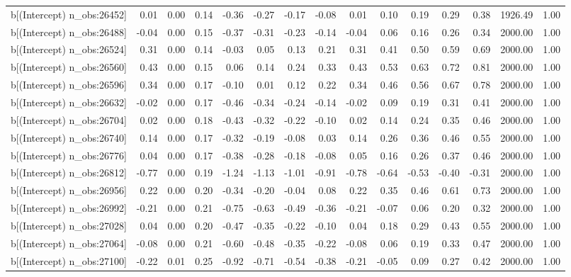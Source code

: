 \begin{table}[ht]
\begin{tabular}{rrrrrrrrrrrrrrr}
  b[(Intercept) n\_obs:26452] & 0.01 & 0.00 & 0.14 & -0.36 & -0.27 & -0.17 & -0.08 & 0.01 & 0.10 & 0.19 & 0.29 & 0.38 & 1926.49 & 1.00 \\ 
  b[(Intercept) n\_obs:26488] & -0.04 & 0.00 & 0.15 & -0.37 & -0.31 & -0.23 & -0.14 & -0.04 & 0.06 & 0.16 & 0.26 & 0.34 & 2000.00 & 1.00 \\ 
  b[(Intercept) n\_obs:26524] & 0.31 & 0.00 & 0.14 & -0.03 & 0.05 & 0.13 & 0.21 & 0.31 & 0.41 & 0.50 & 0.59 & 0.69 & 2000.00 & 1.00 \\ 
  b[(Intercept) n\_obs:26560] & 0.43 & 0.00 & 0.15 & 0.06 & 0.14 & 0.24 & 0.33 & 0.43 & 0.53 & 0.63 & 0.72 & 0.81 & 2000.00 & 1.00 \\ 
  b[(Intercept) n\_obs:26596] & 0.34 & 0.00 & 0.17 & -0.10 & 0.01 & 0.12 & 0.22 & 0.34 & 0.46 & 0.56 & 0.67 & 0.78 & 2000.00 & 1.00 \\ 
  b[(Intercept) n\_obs:26632] & -0.02 & 0.00 & 0.17 & -0.46 & -0.34 & -0.24 & -0.14 & -0.02 & 0.09 & 0.19 & 0.31 & 0.41 & 2000.00 & 1.00 \\ 
  b[(Intercept) n\_obs:26704] & 0.02 & 0.00 & 0.18 & -0.43 & -0.32 & -0.22 & -0.10 & 0.02 & 0.14 & 0.24 & 0.35 & 0.46 & 2000.00 & 1.00 \\ 
  b[(Intercept) n\_obs:26740] & 0.14 & 0.00 & 0.17 & -0.32 & -0.19 & -0.08 & 0.03 & 0.14 & 0.26 & 0.36 & 0.46 & 0.55 & 2000.00 & 1.00 \\ 
  b[(Intercept) n\_obs:26776] & 0.04 & 0.00 & 0.17 & -0.38 & -0.28 & -0.18 & -0.08 & 0.05 & 0.16 & 0.26 & 0.37 & 0.46 & 2000.00 & 1.00 \\ 
  b[(Intercept) n\_obs:26812] & -0.77 & 0.00 & 0.19 & -1.24 & -1.13 & -1.01 & -0.91 & -0.78 & -0.64 & -0.53 & -0.40 & -0.31 & 2000.00 & 1.00 \\ 
  b[(Intercept) n\_obs:26956] & 0.22 & 0.00 & 0.20 & -0.34 & -0.20 & -0.04 & 0.08 & 0.22 & 0.35 & 0.46 & 0.61 & 0.73 & 2000.00 & 1.00 \\ 
  b[(Intercept) n\_obs:26992] & -0.21 & 0.00 & 0.21 & -0.75 & -0.63 & -0.49 & -0.36 & -0.21 & -0.07 & 0.06 & 0.20 & 0.32 & 2000.00 & 1.00 \\ 
  b[(Intercept) n\_obs:27028] & 0.04 & 0.00 & 0.20 & -0.47 & -0.35 & -0.22 & -0.10 & 0.04 & 0.18 & 0.29 & 0.43 & 0.55 & 2000.00 & 1.00 \\ 
  b[(Intercept) n\_obs:27064] & -0.08 & 0.00 & 0.21 & -0.60 & -0.48 & -0.35 & -0.22 & -0.08 & 0.06 & 0.19 & 0.33 & 0.47 & 2000.00 & 1.00 \\ 
  b[(Intercept) n\_obs:27100] & -0.22 & 0.01 & 0.25 & -0.92 & -0.71 & -0.54 & -0.38 & -0.21 & -0.05 & 0.09 & 0.27 & 0.42 & 2000.00 & 1.00 \\ 

\end{tabular}
\end{table}
